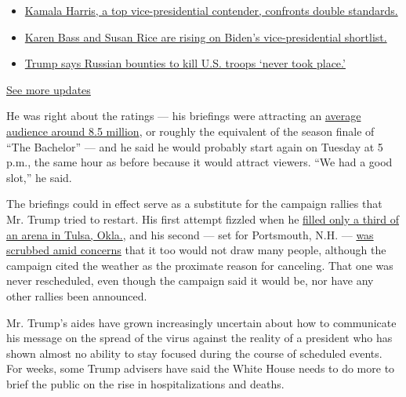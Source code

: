 \begin{itemize}
\tightlist
\item
  \href{https://www.nytimes.com/2020/07/31/us/elections/biden-vs-trump.html?action=click\&pgtype=Article\&state=default\&region=MAIN_CONTENT_1\&context=storylines_live_updates\#link-29fdff45}{Kamala
  Harris, a top vice-presidential contender, confronts double
  standards.}
\item
  \href{https://www.nytimes.com/2020/07/31/us/elections/biden-vs-trump.html?action=click\&pgtype=Article\&state=default\&region=MAIN_CONTENT_1\&context=storylines_live_updates\#link-13ec3d9c}{Karen
  Bass and Susan Rice are rising on Biden's vice-presidential
  shortlist.}
\item
  \href{https://www.nytimes.com/2020/07/31/us/elections/biden-vs-trump.html?action=click\&pgtype=Article\&state=default\&region=MAIN_CONTENT_1\&context=storylines_live_updates\#link-49e9a016}{Trump
  says Russian bounties to kill U.S. troops `never took place.'}
\end{itemize}

\href{https://www.nytimes.com/2020/07/31/us/elections/biden-vs-trump.html?action=click\&pgtype=Article\&state=default\&region=MAIN_CONTENT_1\&context=storylines_live_updates}{See
more updates}

He was right about the ratings --- his briefings were attracting an
\href{https://www.nytimes.com/2020/03/25/business/media/trump-coronavirus-briefings-ratings.html}{average
audience around 8.5 million}, or roughly the equivalent of the season
finale of ``The Bachelor'' --- and he said he would probably start again
on Tuesday at 5 p.m., the same hour as before because it would attract
viewers. ``We had a good slot,'' he said.

The briefings could in effect serve as a substitute for the campaign
rallies that Mr. Trump tried to restart. His first attempt fizzled when
he
\href{https://www.nytimes.com/2020/06/20/us/politics/tulsa-trump-rally.html}{filled
only a third of an arena in Tulsa, Okla.}, and his second --- set for
Portsmouth, N.H. ---
\href{https://www.nytimes.com/2020/07/10/us/politics/trump-nh-rally-postponed.html}{was
scrubbed amid concerns} that it too would not draw many people, although
the campaign cited the weather as the proximate reason for canceling.
That one was never rescheduled, even though the campaign said it would
be, nor have any other rallies been announced.

Mr. Trump's aides have grown increasingly uncertain about how to
communicate his message on the spread of the virus against the reality
of a president who has shown almost no ability to stay focused during
the course of scheduled events. For weeks, some Trump advisers have said
the White House needs to do more to brief the public on the rise in
hospitalizations and deaths.

